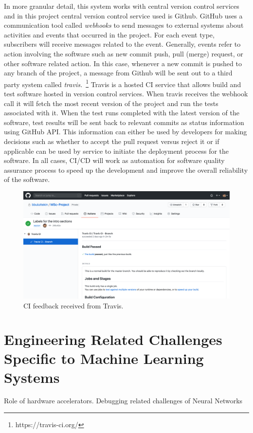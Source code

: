 In more granular detail, this system works with central version control services and in this project central version control service used is Github. GitHub uses a communication tool called \emph{webhooks} to send messages to external systems about activities and events that occurred in the project. For each event type, subscribers will receive messages related to the event. Generally, events refer to action involving the software such as new commit push, pull (merge) request, or other software related action. In this case, whenever a new commit is pushed to any branch of the project, a message from Github will be sent out to a third party system called \emph{travis.}~\footnote{https://travis-ci.org/} Travis is a hosted CI service that allows build and test software hosted in version control services. When travis receives the webhook call it will fetch the most recent version of the project and run the tests associated with it. When the test runs completed with the latest version of the software, test results will be sent back to relevant commits as status information using GitHub API. This information can either be used by developers for making decisions such as whether to accept the pull request versus reject it or if applicable can be used by service to initiate the deployment process for the software. In all cases, CI/CD will work as automation for software quality assurance process to speed up the development and improve the overall reliability of the software.

\begin{figure}[H]
    \centering
    \includegraphics[width=\textwidth]{img/cigithub.png}
    \caption{CI feedback received from Travis.}
    \label{fig:cigithub}
\end{figure}
 

\section{Engineering Related Challenges Specific to Machine Learning Systems} \label{sec:engchallenge}
Role of hardware accelerators. Debugging related challenges of Neural Networks

